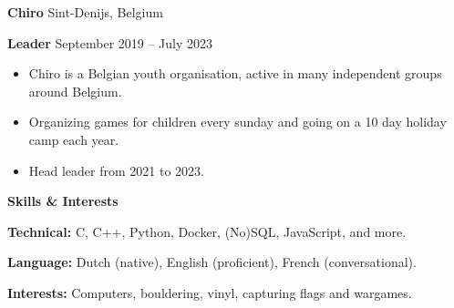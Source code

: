\documentclass[11pt]{article}
\begin{document}
\textbf{Chiro}	\hfill Sint-Denijs, Belgium

\textbf{Leader} \hfill September 2019 – July 2023
\begin{itemize}[noitemsep, topsep=0pt, partopsep=0pt, parsep=0pt]
    \item Chiro is a Belgian youth organisation, active in many independent groups around Belgium.
    \item Organizing games for children every sunday and going on a 10 day holiday camp each year.  
    \item Head leader from 2021 to 2023.
\end{itemize}

\begin{center}
    \textbf{Skills \& Interests}
\end{center}

\textbf{Technical:} C, C++, Python, Docker, (No)SQL, JavaScript, and more.

\textbf{Language:} Dutch (native), English (proficient), French (conversational).

\textbf{Interests:} Computers, bouldering, vinyl, capturing flags and wargames.
\end{document}
